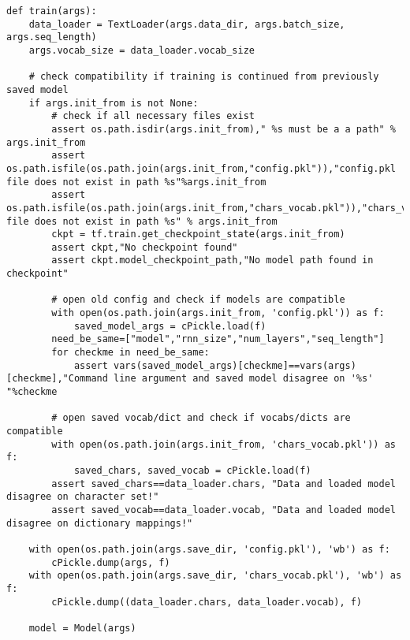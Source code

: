 \begin{lstlisting}
def train(args):
    data_loader = TextLoader(args.data_dir, args.batch_size, args.seq_length)
    args.vocab_size = data_loader.vocab_size
    
    # check compatibility if training is continued from previously saved model
    if args.init_from is not None:
        # check if all necessary files exist 
        assert os.path.isdir(args.init_from)," %s must be a a path" % args.init_from
        assert os.path.isfile(os.path.join(args.init_from,"config.pkl")),"config.pkl file does not exist in path %s"%args.init_from
        assert os.path.isfile(os.path.join(args.init_from,"chars_vocab.pkl")),"chars_vocab.pkl.pkl file does not exist in path %s" % args.init_from
        ckpt = tf.train.get_checkpoint_state(args.init_from)
        assert ckpt,"No checkpoint found"
        assert ckpt.model_checkpoint_path,"No model path found in checkpoint"

        # open old config and check if models are compatible
        with open(os.path.join(args.init_from, 'config.pkl')) as f:
            saved_model_args = cPickle.load(f)
        need_be_same=["model","rnn_size","num_layers","seq_length"]
        for checkme in need_be_same:
            assert vars(saved_model_args)[checkme]==vars(args)[checkme],"Command line argument and saved model disagree on '%s' "%checkme
        
        # open saved vocab/dict and check if vocabs/dicts are compatible
        with open(os.path.join(args.init_from, 'chars_vocab.pkl')) as f:
            saved_chars, saved_vocab = cPickle.load(f)
        assert saved_chars==data_loader.chars, "Data and loaded model disagree on character set!"
        assert saved_vocab==data_loader.vocab, "Data and loaded model disagree on dictionary mappings!"
        
    with open(os.path.join(args.save_dir, 'config.pkl'), 'wb') as f:
        cPickle.dump(args, f)
    with open(os.path.join(args.save_dir, 'chars_vocab.pkl'), 'wb') as f:
        cPickle.dump((data_loader.chars, data_loader.vocab), f)
        
    model = Model(args)


\end{lstlisting}
